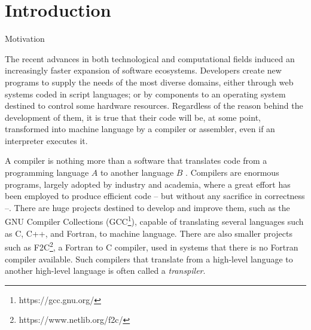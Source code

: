 \chapter{Introduction}
\label{cap:introducao}

\begin{section}{Motivation}\label{sec:motivation}

The recent advances in both technological and computational fields induced an
increasingly faster expansion of software ecosystems. Developers create new
programs to supply the needs of the most diverse domains, either through web
systems coded in script languages; or by components to an operating system
destined to control some hardware resources. Regardless of the reason behind
the development of them, it is true that their code will be, at some
point, transformed into machine language by a compiler or assembler, even if an
interpreter executes it.



A compiler is nothing more than a software that translates code from a
programming language $A$ to another language $B$ \citep{dragonbook}.
Compilers are enormous programs, largely adopted by industry and academia, where
a great effort has been employed to produce efficient code --
but without any sacrifice in correctness --. There are huge projects destined to
develop and improve them, such as the GNU Compiler Collections
(GCC\footnote{https://gcc.gnu.org/}), capable of translating several languages
such as C, C++, and Fortran, to machine language. There are also smaller
projects such as F2C\footnote{https://www.netlib.org/f2c/}, a Fortran to C
compiler, used in systems that there is no Fortran compiler available. Such
compilers that translate from a high-level language to another high-level
language is often called a \textit{transpiler}.


\end{section}
